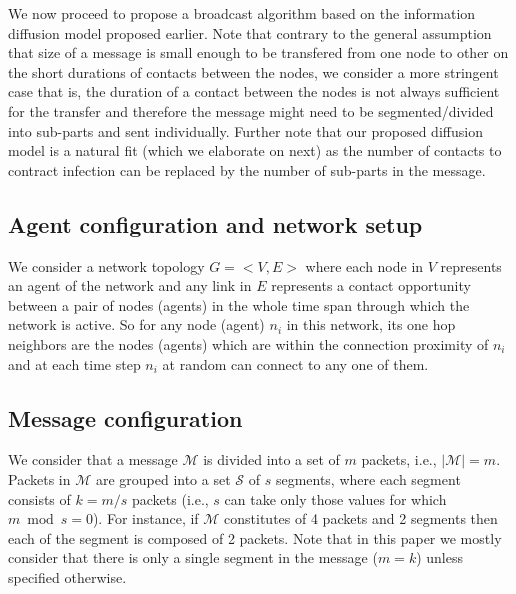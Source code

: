 \noindent
We now proceed to propose a broadcast algorithm based on the information diffusion model proposed earlier. 
Note that contrary to the general assumption that size of a message is small enough to be transfered from one node to other 
on the short durations of contacts between the nodes, we consider a more stringent case that is, the duration of a contact 
between the nodes is not always sufficient for the transfer and therefore the message might need to be 
segmented/divided into sub-parts and sent individually. Further note that our proposed diffusion model is a natural fit (which we elaborate on next) as the 
number of contacts to contract infection can be replaced by the number of sub-parts in the message. 

\subsection{Agent configuration and network setup}
We consider a network topology $G = < V,E >$ where each node in $V$ represents an agent of the network and any link in $E$ represents a contact 
opportunity between a pair of nodes (agents) in the whole time span through which the network is active. So for any node (agent) $n_{i}$ in this network, its one hop 
neighbors are the nodes (agents) which are within the connection proximity of $n_{i}$ and at each time step $n_{i}$ at random can connect to any one of them. 


\subsection{Message configuration}
We consider that a message $\mathcal{M}$ is divided into a set of $m$ packets, i.e., $|\mathcal{M}| = m$. 
 Packets in $\mathcal{M}$ are grouped into a set $\mathcal{S}$ of $s$ segments, 
where each segment consists of $k = m/s$ packets (i.e., $s$ can take only those values for which $m \bmod s = 0$). 
For instance, if $\mathcal{M}$ constitutes of 4 packets and 2 segments then each of the segment is composed of 2 packets. 
Note that in this paper we mostly consider that there is only a single segment in the message ($m=k$) unless specified otherwise.

